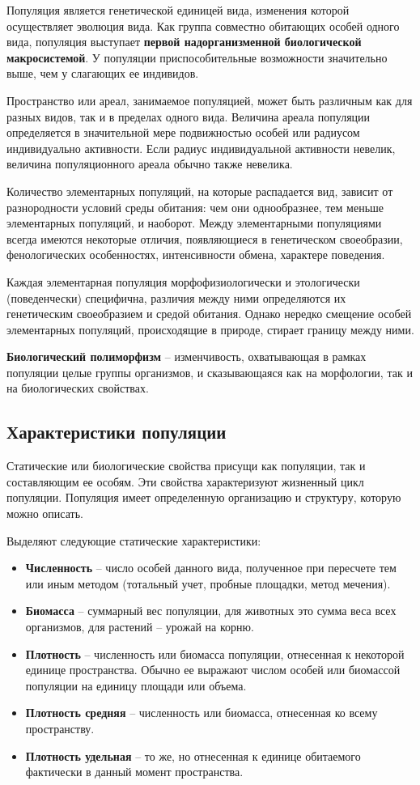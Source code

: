 \documentclass[a5paper, 11pt]{extarticle}
\theoremstyle{definition}
\theoremstyle{definition}
\theoremstyle{definition}
\numberwithin{figure}{section}
\begin{document}
Популяция является генетической единицей вида, изменения которой осуществляет эволюция вида. Как группа совместно обитающих особей одного вида, популяция выступает \textbf{первой надорганизменной биологической макросистемой}. У популяции приспособительные возможности значительно выше, чем у слагающих ее индивидов.

Пространство или ареал, занимаемое популяцией, может быть различным как для разных видов, так и в пределах одного вида. Величина ареала популяции определяется в значительной мере подвижностью особей или радиусом индивидуально активности. Если радиус индивидуальной активности невелик, величина популяционного ареала обычно также невелика.

Количество элементарных популяций, на которые распадается вид, зависит от разнородности условий среды обитания: чем они однообразнее, тем меньше элементарных популяций, и наоборот. Между элементарными популяциями всегда имеются некоторые отличия, появляющиеся в генетическом своеобразии, фенологических особенностях, интенсивности обмена, характере поведения.

Каждая элементарная популяция морфофизиологически и этологически (поведенчески) специфична, различия между ними определяются их генетическим своеобразием и средой обитания. Однако нередко смещение особей элементарных популяций, происходящие в природе, стирает границу между ними.

\textbf{Биологический полиморфизм} -- изменчивость, охватывающая в рамках популяции целые группы организмов, и сказывающаяся как на морфологии, так и на биологических свойствах.

\subsection{Характеристики популяции}

Статические или биологические свойства присущи как популяции, так и составляющим ее особям. Эти свойства характеризуют жизненный цикл  популяции. Популяция имеет определенную организацию и структуру, которую можно описать.

\noindent Выделяют следующие статические характеристики:
\begin{itemize}
    \item \textbf{Численность} --  число особей данного вида, полученное при пересчете тем или иным методом (тотальный учет, пробные площадки, метод мечения).
    \item \textbf{Биомасса} -- суммарный вес популяции, для животных это сумма веса всех организмов, для растений -- урожай на корню.
    \item \textbf{Плотность} -- численность или биомасса популяции, отнесенная к некоторой единице пространства. Обычно ее выражают числом особей или биомассой популяции на единицу площади или объема.
    \item \textbf{Плотность средняя} -- численность или биомасса, отнесенная ко всему пространству.
    \item \textbf{Плотность удельная} -- то же, но отнесенная к единице обитаемого фактически в данный момент пространства.
\end{itemize}
\end{document}
